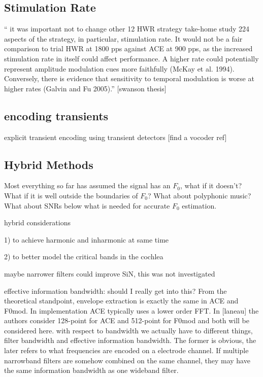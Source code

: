 \documentclass [11pt, proquest,oneside] {uwthesis}[2015/03/03]
\begin{document}
\subsection{Stimulation Rate}

`` it was important not to change other
12 HWR strategy take-home study 224
aspects of the strategy, in particular, stimulation rate. It would not be a fair comparison to trial HWR at 1800 pps against ACE at 900 pps, as the increased stimulation rate in itself could affect performance. A higher rate could potentially represent amplitude modulation cues more faithfully (McKay et al. 1994). Conversely, there is evidence that sensitivity to temporal modulation is worse at higher rates (Galvin and Fu 2005).''
[swanson thesis]

\subsection{encoding transients}

explicit transient encoding using transient detectors  [find a vocoder ref]

\subsection{Hybrid Methods}

Most everything so far has assumed the signal has an $F_0$, what if it doesn't?  What if it is well outside the boundaries of $F_0$?  What about polyphonic music?  What about SNRs below what is needed for accurate $F_0$ estimation.

hybrid considerations

1) to achieve harmonic and inharmonic at same time

2) to better model the critical bands in the cochlea

maybe narrower filters could improve SiN, this was not investigated

effective information bandwidth: should I really get into this?
From the theoretical standpoint, envelope extraction is exactly the same in ACE and F0mod.  In implementation ACE typically uses a lower order FFT.  In [laneau] the authors consider 128-point for ACE and 512-point for F0mod and both will be considered here.
        with respect to bandwidth we actually have to different things, filter bandwidth and effective information bandwidth.  The former is obvious, the later refers to what frequencies are encoded on a electrode channel.  If multiple narrowband filters are somehow combined on the same channel, they may have the same information bandwidth as one wideband filter.
        
\end{document}
